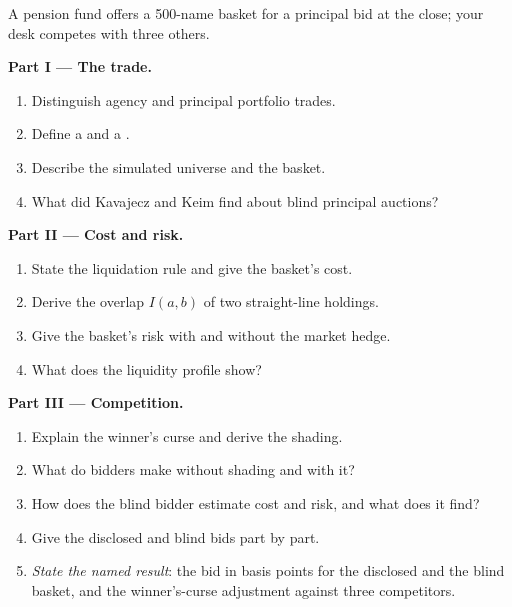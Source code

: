 \begin{problem}\label{pb:mx:portfolio-trades-and-risk-bids:1}
A pension fund offers a 500-name basket for a principal bid at the close; your desk competes with three others.

\medskip\noindent\textbf{Part I --- The trade.}
\begin{enumerate}
\item Distinguish agency and principal portfolio trades.
\item Define a  and a .
\item Describe the simulated universe and the basket.
\item What did Kavajecz and Keim find about blind principal auctions?
\end{enumerate}

\medskip\noindent\textbf{Part II --- Cost and risk.}
\begin{enumerate}[resume]
\item State the liquidation rule and give the basket's cost.
\item Derive the overlap $I(a,b)$ of two straight-line holdings.
\item Give the basket's risk with and without the market hedge.
\item What does the liquidity profile show?
\end{enumerate}

\medskip\noindent\textbf{Part III --- Competition.}
\begin{enumerate}[resume]
\item Explain the winner's curse and derive the shading.
\item What do bidders make without shading and with it?
\item How does the blind bidder estimate cost and risk, and what does it find?
\item Give the disclosed and blind bids part by part.
\item \emph{State the named result}: the bid in basis points for the disclosed and the blind basket, and the winner's-curse adjustment against three
competitors.
\end{enumerate}


\end{problem}
